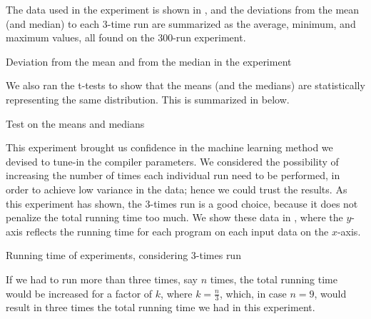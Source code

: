 The data used in the experiment is shown in , and the deviations from the mean (and median) to each $3$-time run are summarized as the average, minimum, and maximum values, all found on the $300$-run experiment.

\begin{table}
  \centering
  \begin{tiny}
  
  \end{tiny}
  \caption{Deviation from the mean and from the median in the experiment}
  \label{tab:simStats}
\end{table}

We also ran the t-tests to show that the means (and the medians) are statistically representing the same distribution. This is summarized in  below.

\begin{table}
  \centering
  \begin{tiny}
  
  \end{tiny}
  \caption{Test on the means and medians}
  \label{tab:statTest}
\end{table}

This experiment brought us confidence in the machine learning method we devised to tune-in the compiler parameters. We considered the possibility of increasing the number of times each individual run need to be performed, in order to achieve low variance in the data; hence we could trust the results. As this experiment has shown, the $3$-times run is a good choice, because it does not penalize the total running time too much. We show these data in , where the $y$-axis reflects the running time for each program on each input data on the $x$-axis.

\begin{table}
  \centering
  \begin{tiny}
  
  \end{tiny}
  \caption{Running time of experiments, considering $3$-times run}
  \label{tab:runTime}
\end{table}

If we had to run more than three times, say $n$ times, the total running time would be increased for a factor of $k$, where $k = \frac{n}{3}$, which, in case $n = 9$, would result in three times the total running time we had in this experiment.
